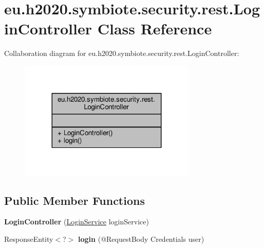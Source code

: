 \hypertarget{classeu_1_1h2020_1_1symbiote_1_1security_1_1rest_1_1LoginController}{}\section{eu.\+h2020.\+symbiote.\+security.\+rest.\+Login\+Controller Class Reference}
\label{classeu_1_1h2020_1_1symbiote_1_1security_1_1rest_1_1LoginController}


Collaboration diagram for eu.\+h2020.\+symbiote.\+security.\+rest.\+Login\+Controller\+:
\nopagebreak
\begin{figure}[H]
\begin{center}
\leavevmode
\includegraphics[width=239pt]{classeu_1_1h2020_1_1symbiote_1_1security_1_1rest_1_1LoginController__coll__graph}
\end{center}
\end{figure}
\subsection*{Public Member Functions}
\begin{DoxyCompactItemize}
\item 
{\bfseries Login\+Controller} (\hyperlink{classeu_1_1h2020_1_1symbiote_1_1security_1_1services_1_1LoginService}{Login\+Service} login\+Service)\hypertarget{classeu_1_1h2020_1_1symbiote_1_1security_1_1rest_1_1LoginController_a2f04e63185380098756b5ae1012794f3}{}\label{classeu_1_1h2020_1_1symbiote_1_1security_1_1rest_1_1LoginController_a2f04e63185380098756b5ae1012794f3}

\item 
Response\+Entity$<$?$>$ {\bfseries login} (@Request\+Body Credentials user)\hypertarget{classeu_1_1h2020_1_1symbiote_1_1security_1_1rest_1_1LoginController_a305fadbc421654617487035743d13d1c}{}\label{classeu_1_1h2020_1_1symbiote_1_1security_1_1rest_1_1LoginController_a305fadbc421654617487035743d13d1c}

\end{DoxyCompactItemize}


